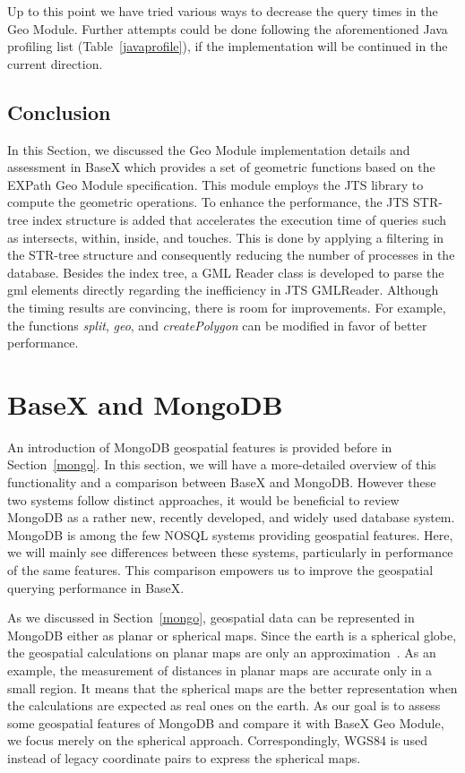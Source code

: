 \documentclass[a4paper,12pt]{article}
\begin{document}
Up to this point we have tried various ways to decrease the query times in the Geo Module. Further attempts could be done following the aforementioned Java profiling list (Table~\ref{javaprofile}), if the implementation will be continued in the current direction.

\subsection{Conclusion}
\label{BXconc}
In this Section, we discussed the Geo Module implementation details and assessment in BaseX which provides a set of geometric functions based on the EXPath Geo Module specification. This module employs the JTS library to compute the geometric operations. To enhance the performance, the JTS STR-tree index structure is added that accelerates the execution time of queries such as intersects, within, inside, and touches. This is done by applying a filtering in the STR-tree structure and consequently reducing the number of processes in the database. Besides the index tree, a GML Reader class is developed to parse the gml elements directly regarding the inefficiency in JTS GMLReader. Although the timing results are convincing, there is room for improvements. For example, the functions \textit{split}, \textit{geo}, and \textit{createPolygon} can be modified in favor of better performance.

\newpage
\section{BaseX and MongoDB}
\label{s.mongo}

An introduction of MongoDB geospatial features is provided before in Section~\ref{mongo}. In this section, we will have a more-detailed overview of this functionality and a comparison between BaseX and MongoDB. However these two systems follow distinct approaches, it would be beneficial to review MongoDB as a rather new, recently developed, and widely used database system. MongoDB is among the few NOSQL systems providing geospatial features. Here, we will mainly see differences between these systems, particularly in performance of the same features. This comparison empowers us to improve the geospatial querying performance in BaseX. 

As we discussed in Section~\ref{mongo}, geospatial data can be represented in MongoDB either as planar or spherical maps. Since the earth is a spherical globe, the geospatial calculations on planar maps are only an approximation~\cite{coordsys,coordsys-mongo}. As an example, the measurement of distances in planar maps are accurate only in a small region. It means that the spherical maps are the better representation when the calculations are expected as real ones on the earth. As our goal is to assess some geospatial features of MongoDB and compare it with BaseX Geo Module, we focus merely on the spherical approach. Correspondingly, WGS84 is used instead of legacy coordinate pairs to express the spherical maps. 
\end{document}
